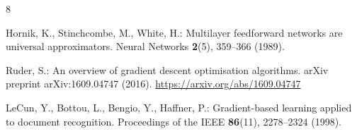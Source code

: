 \documentclass[runningheads]{llncs}
\begin{document}
\begin{thebibliography}{8}

Hornik, K., Stinchcombe, M., White, H.: Multilayer feedforward networks are
universal approximators. Neural Networks \textbf{2}(5), 359--366 (1989).

Ruder, S.: An overview of gradient descent optimisation algorithms. arXiv
preprint arXiv:1609.04747 (2016). \url{https://arxiv.org/abs/1609.04747}

LeCun, Y., Bottou, L., Bengio, Y., Haffner, P.: Gradient-based learning
applied to document recognition. Proceedings of the IEEE \textbf{86}(11),
2278--2324 (1998). 

\end{thebibliography}
\end{document}
